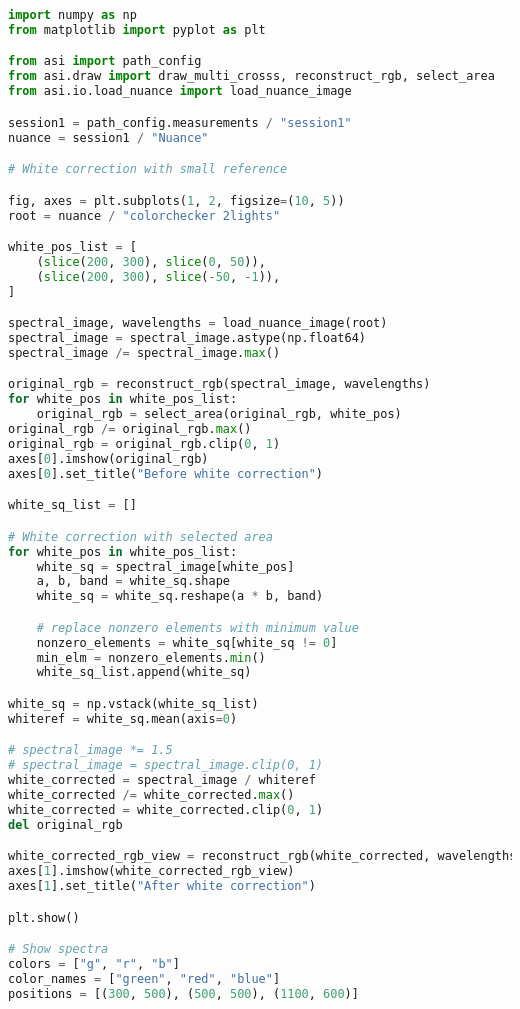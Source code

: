 \begin{lstlisting}[language=python, caption=White correction for Nuance Cmaera with small reference, label={code:wc-nuance-small}]
import numpy as np
from matplotlib import pyplot as plt

from asi import path_config
from asi.draw import draw_multi_crosss, reconstruct_rgb, select_area
from asi.io.load_nuance import load_nuance_image

session1 = path_config.measurements / "session1"
nuance = session1 / "Nuance"

# White correction with small reference

fig, axes = plt.subplots(1, 2, figsize=(10, 5))
root = nuance / "colorchecker 2lights"

white_pos_list = [
    (slice(200, 300), slice(0, 50)),
    (slice(200, 300), slice(-50, -1)),
]

spectral_image, wavelengths = load_nuance_image(root)
spectral_image = spectral_image.astype(np.float64)
spectral_image /= spectral_image.max()

original_rgb = reconstruct_rgb(spectral_image, wavelengths)
for white_pos in white_pos_list:
    original_rgb = select_area(original_rgb, white_pos)
original_rgb /= original_rgb.max()
original_rgb = original_rgb.clip(0, 1)
axes[0].imshow(original_rgb)
axes[0].set_title("Before white correction")

white_sq_list = []

# White correction with selected area
for white_pos in white_pos_list:
    white_sq = spectral_image[white_pos]
    a, b, band = white_sq.shape
    white_sq = white_sq.reshape(a * b, band)

    # replace nonzero elements with minimum value
    nonzero_elements = white_sq[white_sq != 0]
    min_elm = nonzero_elements.min()
    white_sq_list.append(white_sq)

white_sq = np.vstack(white_sq_list)
whiteref = white_sq.mean(axis=0)

# spectral_image *= 1.5
# spectral_image = spectral_image.clip(0, 1)
white_corrected = spectral_image / whiteref
white_corrected /= white_corrected.max()
white_corrected = white_corrected.clip(0, 1)
del original_rgb

white_corrected_rgb_view = reconstruct_rgb(white_corrected, wavelengths)
axes[1].imshow(white_corrected_rgb_view)
axes[1].set_title("After white correction")

plt.show()

# Show spectra
colors = ["g", "r", "b"]
color_names = ["green", "red", "blue"]
positions = [(300, 500), (500, 500), (1100, 600)]


\end{lstlisting}
